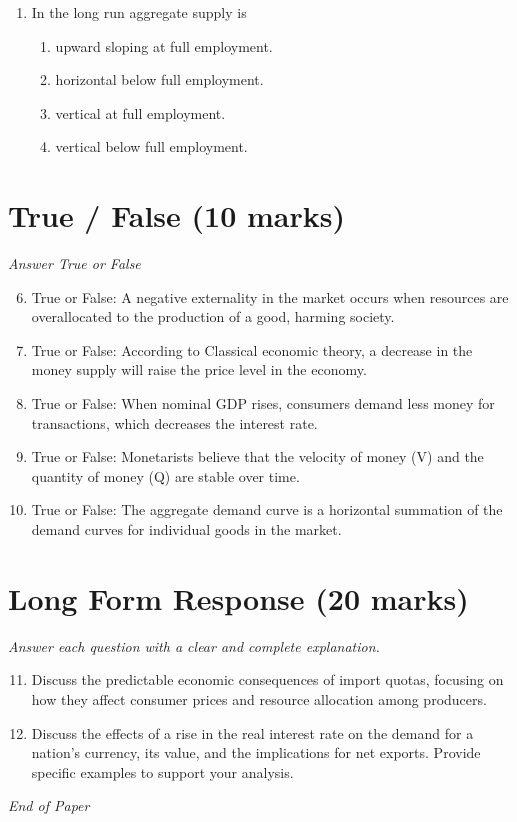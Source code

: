 \documentclass[12pt]{article}
\begin{document}
\begin{enumerate}[label=\arabic*.]
\begin{enumerate}[label=(\alph*)]
    \item Private property.
    \item Central planners set wages and prices.
\end{enumerate}
\item In the long run aggregate supply is
\begin{enumerate}[label=(\alph*)]
    \item upward sloping at full employment.
    \item horizontal below full employment.
    \item vertical at full employment.
    \item vertical below full employment.
\end{enumerate}
\end{enumerate}

\section*{True / False (10 marks)}
\textit{Answer True or False}
\begin{enumerate}[label=\arabic*.]
\setcounter{enumi}{5}
\item True or False: A negative externality in the market occurs when resources are overallocated to the production of a good, harming society.
\item True or False: According to Classical economic theory, a decrease in the money supply will raise the price level in the economy.
\item True or False: When nominal GDP rises, consumers demand less money for transactions, which decreases the interest rate.
\item True or False: Monetarists believe that the velocity of money (V) and the quantity of money (Q) are stable over time.
\item True or False: The aggregate demand curve is a horizontal summation of the demand curves for individual goods in the market.
\end{enumerate}

\section*{Long Form Response (20 marks)}
\textit{Answer each question with a clear and complete explanation.}
\begin{enumerate}[label=\arabic*.]
\setcounter{enumi}{10}
\item Discuss the predictable economic consequences of import quotas, focusing on how they affect consumer prices and resource allocation among producers.
\item Discuss the effects of a rise in the real interest rate on the demand for a nation's currency, its value, and the implications for net exports. Provide specific examples to support your analysis.
\end{enumerate}

\vfill
\noindent\textit{End of Paper}
\end{document}
